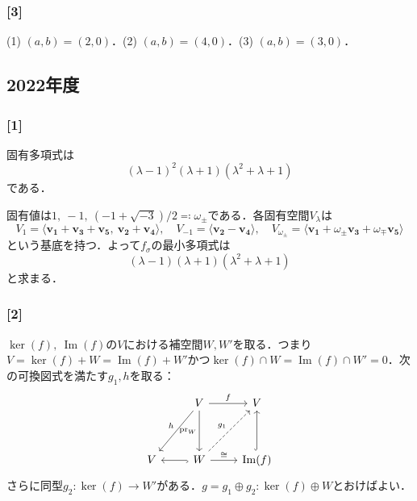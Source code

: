 \documentclass[a4j]{ltjsarticle}
\newcommand{\1}{\mathbbm{1}}
\numberwithin{equation}{section}
\theoremstyle{definition}
\begin{document}
\subsubsection*{[3]}
(1) $(a,b)=(2,0)$．(2) $(a,b)=(4,0)$．(3) $(a,b)=(3,0)$．
\subsection{2022年度}
\subsubsection*{[1]}
固有多項式は
\begin{equation}
    (\lambda-1)^2(\lambda+1)(\lambda^2+\lambda+1)
\end{equation}
である．

固有値は$1,\ -1,\ (-1+\sqrt{-3})/2\eqcolon \omega_{\pm}$である．各固有空間$V_{\lambda}$は
\begin{equation}
    V_{1}=\langle\bm{v_1}+\bm{v_3}+\bm{v_5},\ \bm{v_2}+\bm{v_4}\rangle,\quad V_{-1}=\langle\bm{v_2}-\bm{v_4}\rangle,\quad V_{\omega_{\pm}}=\langle\bm{v_1}+\omega_{\pm}\bm{v_3}+\omega_{\mp}\bm{v_5}\rangle
\end{equation}
という基底を持つ．よって$f_\sigma$の最小多項式は
\begin{equation}
    (\lambda-1)(\lambda+1)(\lambda^2+\lambda+1)
\end{equation}
と求まる．
\subsubsection*{[2]}
$\ker(f),\ \mathop{\mathrm{Im}}(f)$の$V$における補空間$W,W'$を取る．つまり$V=\ker(f)+ W=\mathop{\mathrm{Im}}(f)+W'$かつ$\ker (f) \cap W=\mathop{\mathrm{Im}}(f)\cap W'=0$．次の可換図式を満たす$g_1,h$を取る：
\begin{equation}
    \begin{tikzcd}
      & V \arrow[dd, "\mathop{\mathrm{pr}}_{W}"'] \arrow[ldd, "h"'] \arrow[r, "f"] & V                                        \\
      &                                                                            &                                          \\
    V & W \arrow[l, hook] \arrow[r, "\cong"] \arrow[ruu, "g_1", dashed]            & \mathop{\mathrm{Im}}(f) \arrow[uu, hook]
    \end{tikzcd}
\end{equation}
さらに同型$g_2\colon \ker(f)\to W'$がある．$g=g_1\oplus g_2\colon \ker(f)\oplus W$とおけばよい．
\end{document}
